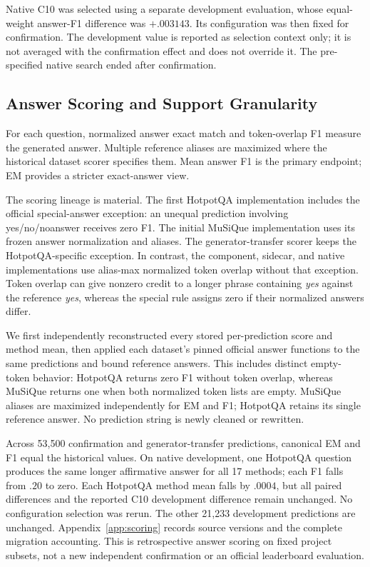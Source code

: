 \documentclass[11pt,a4paper]{article}
\begin{document}
Native C10 was selected using a separate development evaluation, whose
equal-weight answer-F1 difference was $+.003143$. Its configuration was then
fixed for confirmation. The development value is reported as selection
context only; it is not averaged with the confirmation effect and does not
override it. The pre-specified native search ended after confirmation.

\subsection{Answer Scoring and Support Granularity}
For each question, normalized answer exact match and token-overlap F1 measure
the generated answer. Multiple reference aliases are maximized where the
historical dataset scorer specifies them. Mean answer F1 is the primary
endpoint; EM provides a stricter exact-answer view.

The scoring lineage is material. The first HotpotQA implementation includes
the official special-answer exception: an unequal prediction involving
yes/no/noanswer receives zero F1. The initial MuSiQue implementation uses
its frozen answer normalization and aliases. The generator-transfer scorer
keeps the HotpotQA-specific exception. In contrast, the component, sidecar,
and native implementations use alias-max normalized token overlap without
that exception. Token overlap can give nonzero credit to a longer phrase
containing \emph{yes} against the reference \emph{yes}, whereas the
special rule assigns zero if their normalized answers differ.

We first independently reconstructed every stored per-prediction score and
method mean, then applied each dataset's pinned official answer functions to
the same predictions and bound reference answers. This includes distinct
empty-token behavior: HotpotQA returns zero F1 without token overlap, whereas
MuSiQue returns one when both normalized token lists are empty. MuSiQue
aliases are maximized independently for EM and F1; HotpotQA retains its
single reference answer. No prediction string is newly cleaned or rewritten.

Across 53,500 confirmation and generator-transfer predictions, canonical EM
and F1 equal the historical values. On native development, one HotpotQA
question produces the same longer affirmative answer for all 17 methods;
each F1 falls from $.20$ to zero. Each HotpotQA method mean falls by $.0004$,
but all paired differences and the reported C10 development difference remain
unchanged. No configuration selection was rerun. The other 21,233 development
predictions are unchanged. Appendix~\ref{app:scoring} records source versions
and the complete migration accounting. This is retrospective answer scoring
on fixed project subsets, not a new independent confirmation or an official
leaderboard evaluation.
\end{document}
